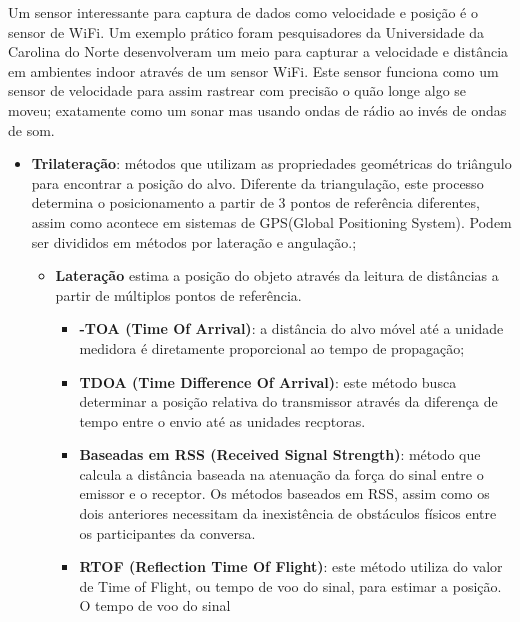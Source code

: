 Um sensor interessante para captura de dados como velocidade e posição é o sensor de WiFi. Um exemplo prático foram pesquisadores da Universidade da Carolina do Norte desenvolveram um meio para capturar a velocidade e distância em ambientes indoor através de um sensor WiFi. Este sensor funciona como um sensor de velocidade para assim rastrear com precisão o quão longe algo se moveu; exatamente como um sonar mas usando ondas de rádio ao invés de ondas de som.


\begin{itemize}

    \item \textbf{Trilateração}: métodos que utilizam as propriedades geométricas do triângulo para encontrar a posição do alvo. Diferente da triangulação, este processo determina o posicionamento a partir de 3 pontos de referência diferentes, assim como acontece em sistemas de GPS(Global Positioning System). Podem ser divididos em métodos por lateração e angulação.;
    
    \begin{itemize}
        \item \textbf{Lateração} estima a posição do objeto através da leitura de distâncias a partir de múltiplos pontos de referência.
        
        \begin{itemize}
            \item \textbf{-TOA (Time Of Arrival)}: a distância do alvo móvel até a unidade medidora
            é diretamente proporcional ao tempo de propagação; 
            \item \textbf{TDOA (Time Difference Of Arrival)}: este método busca determinar a posição relativa do transmissor através da diferença de tempo entre o envio até as unidades recptoras.
            \item \textbf{Baseadas em RSS (Received Signal Strength)}: método que calcula a distância baseada na atenuação da força do sinal entre o emissor e o receptor. Os métodos baseados em RSS, assim como os dois anteriores necessitam da inexistência de obstáculos físicos entre os participantes da conversa.
            \item \textbf{RTOF (Reflection Time Of Flight)}: este método utiliza do valor de Time of Flight, ou tempo de voo do sinal, para estimar a posição. O tempo de voo do sinal 
        \end{itemize}

    \end{itemize}

\end{itemize}

